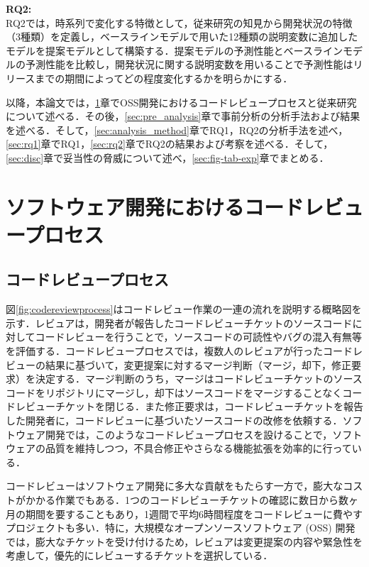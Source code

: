 \documentclass[submit]{ipsj}
\begin{document}
\noindent\textbf{RQ2: \rqtwo}\\
RQ2では，時系列で変化する特徴として，従来研究\cite{integrator}\cite{release_merge}の知見から開発状況の特徴（3種類）を定義し，ベースラインモデルで用いた12種類の説明変数に追加したモデルを提案モデルとして構築する．提案モデルの予測性能とベースラインモデルの予測性能を比較し，開発状況に関する説明変数を用いることで予測性能はリリースまでの期間によってどの程度変化するかを明らかにする．

以降，本論文では，\ref{sec:intro}章でOSS開発におけるコードレビュープロセスと従来研究について述べる．その後，\ref{sec:pre_analysis}章で事前分析の分析手法および結果を述べる．そして，\ref{sec:analysis_method}章でRQ1，RQ2の分析手法を述べ，\ref{sec:rq1}章でRQ1，\ref{sec:rq2}章でRQ2の結果および考察を述べる．そして，\ref{sec:disc}章で妥当性の脅威について述べ，\ref{sec:fig-tab-exp}章でまとめる．

\chapter{ソフトウェア開発におけるコードレビュープロセス}\label{sec:intro}

\section{コードレビュープロセス}
図\ref{fig:codereviewprocess}はコードレビュー作業の一連の流れを説明する概略図を示す．レビュアは，開発者が報告したコードレビューチケットのソースコードに対してコードレビューを行うことで，ソースコードの可読性やバグの混入有無等を評価する．コードレビュープロセスでは，複数人のレビュアが行ったコードレビューの結果に基づいて，変更提案に対するマージ判断（マージ，却下，修正要求）を決定する．マージ判断のうち，マージはコードレビューチケットのソースコードをリポジトリにマージし，却下はソースコードをマージすることなくコードレビューチケットを閉じる．また修正要求は，コードレビューチケットを報告した開発者に，コードレビューに基づいたソースコードの改修を依頼する．ソフトウェア開発では，このようなコードレビュープロセスを設けることで，ソフトウェアの品質を維持しつつ，不具合修正やさらなる機能拡張を効率的に行っている．

コードレビューはソフトウェア開発に多大な貢献をもたらす一方で，膨大なコストがかかる作業でもある．1つのコードレビューチケットの確認に数日から数ヶ月の期間を要することもあり，1週間で平均6時間程度をコードレビューに費やすプロジェクトも多い\cite{review2}．特に，大規模なオープンソースソフトウェア (OSS) 開発では，膨大なチケットを受け付けるため，レビュアは変更提案の内容や緊急性を考慮して，優先的にレビューするチケットを選択している\cite{integrator}．
\end{document}
